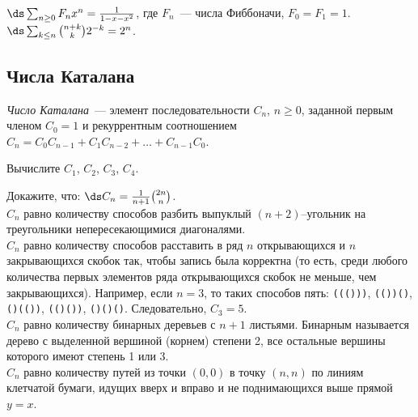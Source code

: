 \begin{problems}

\item
\sbp
\(\ds
    \sum_{n \geq 0}
        F_n x^n
=
    \frac{1}{1 - x - x^2}
\), где $F_n$~--- числа Фиббоначи, $F_0 = F_1 = 1$.
\\[0.5ex]
\sbp
\(\ds
    \sum_{k \leq n}
        \binom{n + k}{k} 2^{-k}
=
    2^n
\).

\end{problems}

\subsection*{Числа Каталана}

\emph{Число Каталана}~--- элемент последовательности $C_n$, $n \geq 0$, заданной
первым членом $C_0 = 1$ и рекуррентным соотношением
\(
    C_n
=
    C_0 C_{n - 1}
    +
    C_1 C_{n - 2}
    +
    \ldots
    +
    C_{n - 1} C_0
\).

\begin{problems}

\item
Вычислите $C_1$, $C_2$, $C_3$, $C_4$.

\item
Докажите, что:
\quad
\sbp
\(\ds
    C_n
=
    \frac{1}{n + 1}
    \binom{2n}{n}
\).
\\[0.5ex]
\sbp
$C_n$ равно количеству способов разбить выпуклый $(n + 2)$--угольник на
треугольники непересекающимися диагоналями.
\\
\sbp
$C_n$ равно количеству способов расставить в ряд $n$ открывающихся и $n$
закрывающихся скобок так, чтобы запись была корректна
(то есть, среди любого количества первых элементов ряда открывающихся скобок не
меньше, чем закрывающихся).
Например, если $n = 3$, то таких способов пять:
\mbox{\tt((()))}, \mbox{\tt(())()}, \mbox{\tt()(())}, \mbox{\tt(()())},
\mbox{\tt()()()}.
Следовательно, $C_3 = 5$.
\\
\sbp
$C_n$ равно количеству бинарных деревьев с $n + 1$ листьями.
Бинарным называется дерево с выделенной вершиной (корнем) степени 2, все
остальные вершины которого имеют степень 1 или 3.
\\
\sbp
$C_n$ равно количеству путей из точки $(0, 0)$ в точку $(n, n)$ по линиям
клетчатой бумаги, идущих вверх и вправо и не поднимающихся выше прямой $y = x$.

\let\ds\undefined

\end{problems}

